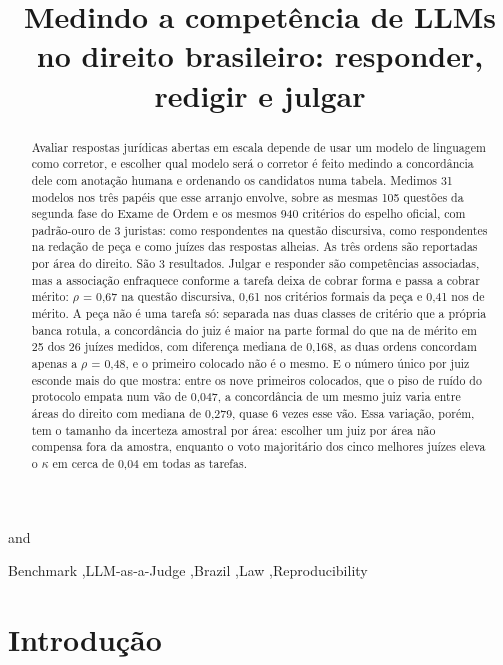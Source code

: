 \documentclass{IOS-Book-Article}
\begin{document}
\begin{frontmatter}
\title{Medindo a competência de LLMs no direito brasileiro: responder, redigir e julgar}
\author[A]{ }
and
\author[A]{ }
\address[A]{Instituto de Ciências Matemáticas e de Computação, Universidade de São Paulo}
\begin{abstract}
Avaliar respostas jurídicas abertas em escala depende de usar um modelo de linguagem como corretor, e escolher qual modelo será o corretor é feito medindo a concordância dele com anotação humana e ordenando os candidatos numa tabela. Medimos 31 modelos nos três papéis que esse arranjo envolve, sobre as mesmas 105 questões da segunda fase do Exame de Ordem e os mesmos 940 critérios do espelho oficial, com padrão-ouro de 3 juristas: como respondentes na questão discursiva, como respondentes na redação de peça e como juízes das respostas alheias. As três ordens são reportadas por área do direito. São 3 resultados. Julgar e responder são competências associadas, mas a associação enfraquece conforme a tarefa deixa de cobrar forma e passa a cobrar mérito: $\rho$ = 0,67 na questão discursiva, 0,61 nos critérios formais da peça e 0,41 nos de mérito. A peça não é uma tarefa só: separada nas duas classes de critério que a própria banca rotula, a concordância do juiz é maior na parte formal do que na de mérito em 25 dos 26 juízes medidos, com diferença mediana de 0,168, as duas ordens concordam apenas a $\rho$ = 0,48, e o primeiro colocado não é o mesmo. E o número único por juiz esconde mais do que mostra: entre os nove primeiros colocados, que o piso de ruído do protocolo empata num vão de 0,047, a concordância de um mesmo juiz varia entre áreas do direito com mediana de 0,279, quase 6 vezes esse vão. Essa variação, porém, tem o tamanho da incerteza amostral por área: escolher um juiz por área não compensa fora da amostra, enquanto o voto majoritário dos cinco melhores juízes eleva o $\kappa$ em cerca de 0,04 em todas as tarefas.
\end{abstract}
\begin{keyword}
Benchmark \sep LLM-as-a-Judge \sep Brazil \sep Law \sep Reproducibility
\end{keyword}
\end{frontmatter}

\section{Introdução}
\end{document}
